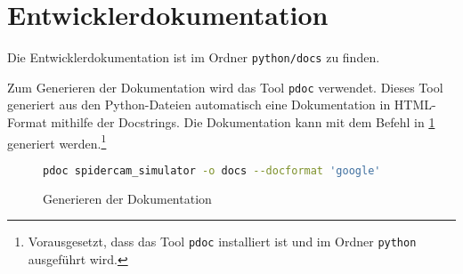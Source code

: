 \section{Entwicklerdokumentation}
\label{sec:entwicklerdokumentation}

Die Entwicklerdokumentation ist im Ordner \texttt{python/docs} zu finden.

Zum Generieren der Dokumentation wird das Tool \texttt{pdoc} verwendet.
Dieses Tool generiert aus den Python-Dateien automatisch eine Dokumentation in HTML-Format mithilfe der Docstrings.
Die Dokumentation kann mit dem Befehl in \ref{lst:generate_documentation} generiert werden.\footnote{Vorausgesetzt, dass das Tool \texttt{pdoc} installiert ist und im Ordner \texttt{python} ausgeführt wird.}

\begin{figure}[H]
    \centering
    \begin{lstlisting}[language=bash] 
        pdoc spidercam_simulator -o docs --docformat 'google'
    \end{lstlisting}
    \caption{Generieren der Dokumentation}
    \label{lst:generate_documentation}
\end{figure}